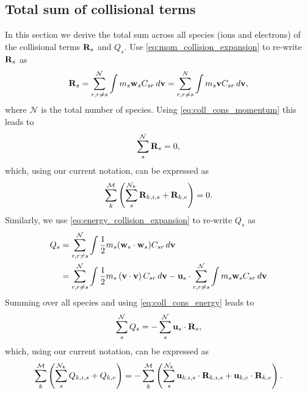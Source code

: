 \documentclass[a4paper,11pt]{report}
\begin{document}
\subsection{Total sum of collisional terms}
In this section we derive the total sum across all species (ions and electrons) of the collisional terms $\mathbf{R}_s$ and $Q_s$. Use \cref{eq:mom_collision_expansion} to re-write $\mathbf{R}_s$ as
\begin{equation*}
    \mathbf{R}_s = \sum_{r,r \ne s}^\mathcal{N} \int m_s \mathbf{w}_s C_{s r} \, d\mathbf{v} = \sum^N_{r,r \ne s} \int m_s \mathbf{v} C_{s r} \, d\mathbf{v},
\end{equation*}
where $\mathcal{N}$ is the total number of species. Using \cref{eq:coll_cons_momentum} this leads to
\begin{equation}
    \label{eq:sf_sum_mom_collisions}
    \sum_s^\mathcal{N} \mathbf{R}_s = 0,
\end{equation}
which, using our current notation, can be expressed as
\begin{equation}
    \label{eq:sf_sum_mom_collisions_mat}
    \sum_k^\mathcal{M} \left( \sum_s^{\mathcal{N}_k} \mathbf{R}_{k,i,s} + \mathbf{R}_{k,e} \right) = 0.
\end{equation}
Similarly, we use \cref{eq:energy_collision_expansion} to re-write $Q_s$ as
\begin{align*}
    Q_s &= \sum_{r,r \ne s}^\mathcal{N} \int \frac{1}{2} m_s (\mathbf{w}_s \cdot \mathbf{w}_s) C_{s r} \, d\mathbf{v} \\
    &= \sum_{r,r \ne s}^\mathcal{N} \int \frac{1}{2} m_s \left( \mathbf{v} \cdot \mathbf{v} \right) C_{sr} \, d\mathbf{v} - \mathbf{u}_s \cdot \sum_{r,r \ne s}^\mathcal{N} \int m_s \mathbf{w}_s C_{s r} \, d\mathbf{v}
\end{align*}
Summing over all species and using \cref{eq:coll_cons_energy} leads to
\begin{equation}
    \label{eq:sf_sum_energy_collisions}
    \sum_s^\mathcal{N} Q_s = - \sum_s^\mathcal{N} \mathbf{u}_s \cdot \mathbf{R}_s,
\end{equation}
which, using our current notation, can be expressed as
\begin{equation}
    \label{eq:sf_sum_energy_collisions_mat}
    \sum_k^\mathcal{M} \left( \sum_s^{\mathcal{N}_k} Q_{k,i,s} + Q_{k,e} \right) = - \sum_k^\mathcal{M} \left( \sum_s^{\mathcal{N}_k} \mathbf{u}_{k,i,s} \cdot \mathbf{R}_{k,i,s} + \mathbf{u}_{k,e} \cdot \mathbf{R}_{k,e} \right).
\end{equation}

\end{document}
